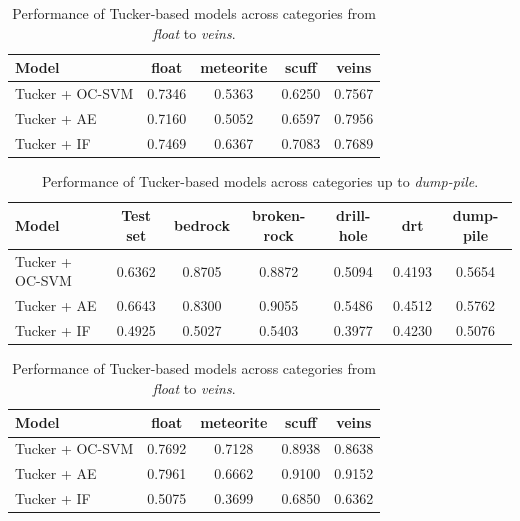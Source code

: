 \documentclass[pdflatex,sn-mathphys-ay]{sn-jnl}
\begin{document}
\begin{table}
\centering
\begin{tabular}{lcccc}
\hline
\textbf{Model} & \textbf{float} & \textbf{meteorite} & \textbf{scuff} & \textbf{veins} \\
\hline
Tucker + OC-SVM & 0.7346 & 0.5363 & 0.6250 & 0.7567 \\
Tucker + AE     & 0.7160 & 0.5052 & 0.6597 & 0.7956 \\
Tucker + IF     & 0.7469 & 0.6367 & 0.7083 & 0.7689 \\
\hline
\end{tabular}
\caption{Performance of Tucker-based models across categories from \textit{float} to \textit{veins}.}
\label{tab:results_inOrder_tucker_part2}
\end{table}

\begin{table}
\centering
\begin{tabular}{lcccccc}
\hline
\textbf{Model} & \textbf{Test set} & \textbf{bedrock} & \textbf{broken-rock} & \textbf{drill-hole} & \textbf{drt} & \textbf{dump-pile} \\
\hline
Tucker + OC-SVM & 0.6362 & 0.8705 & 0.8872 & 0.5094 & 0.4193 & 0.5654 \\
Tucker + AE     & 0.6643 & 0.8300 & 0.9055 & 0.5486 & 0.4512 & 0.5762 \\
Tucker + IF     & 0.4925 & 0.5027 & 0.5403 & 0.3977 & 0.4230 & 0.5076 \\
\hline
\end{tabular}
\caption{Performance of Tucker-based models across categories up to \textit{dump-pile}.}
\label{tab:results_random_tucker_part1}
\end{table}

\begin{table}
\centering
\begin{tabular}{lcccc}
\hline
\textbf{Model} & \textbf{float} & \textbf{meteorite} & \textbf{scuff} & \textbf{veins} \\
\hline
Tucker + OC-SVM & 0.7692 & 0.7128 & 0.8938 & 0.8638 \\
Tucker + AE     & 0.7961 & 0.6662 & 0.9100 & 0.9152 \\
Tucker + IF     & 0.5075 & 0.3699 & 0.6850 & 0.6362 \\
\hline
\end{tabular}
\caption{Performance of Tucker-based models across categories from \textit{float} to \textit{veins}.}
\label{tab:results_random_tucker_part2}
\end{table}
\end{document}
